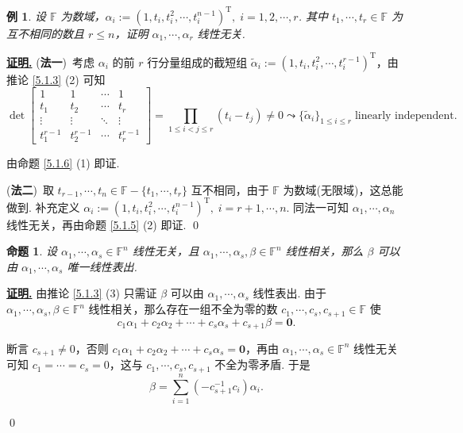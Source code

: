\documentclass[10pt,openany]{article}
\theoremstyle{thmstyle} %
\theoremstyle{defstyle} %
\theoremstyle{prostyle} %
\newtheorem{proposition}[theorem]{命题}
\theoremstyle{exastyle}
\newtheorem{example}[theorem]{例}
\theoremstyle{remstyle}
\renewenvironment{proof}[1][证明]{\par\underline{\textbf{#1.}} \;\fangsong}{\qed\par}
\newcommand{\T}{^{\text{T}}}
\newcommand{\F}{\mathbb{F}}
\begin{document}
\begin{example}
	设 \( \F \) 为数域，\( \alpha_i:=(1,t_i,t_i^2,\cdots,t_i^{n-1})\T, \; i=1,2,\cdots,r \). 其中 \( t_1,\cdots,t_r \in \F \) 为互不相同的数且 \( r \leq n \)，证明 \( \alpha_1,\cdots,\alpha_r \) 线性无关.
\end{example}

\begin{proof}
	(\textbf{法一})\ 考虑 \( \alpha_i \) 的前 \( r \) 行分量组成的截短组 \( \widetilde{\alpha}_i:=(1,t_i,t_i^2,\cdots,t_i^{r-1})\T \)，由推论 \ref{5.1.3} (2) 可知
	\[ \det \begin{bmatrix}
	     1 & 1 & \cdots & 1 \\
	     t_1 & t_2 & \cdots & t_{r} \\
	     \vdots & \vdots & \ddots & \vdots \\
	     t_1^{r-1} & t_2^{r-1} & \cdots & t_{r}^{r-1}
	\end{bmatrix}= \prod_{1 \leq i <j \leq r}^{} (t_i-t_j) \neq 0 \leadsto \{\widetilde{\alpha}_i\}_{1 \leq i \leq r} \; \text{linearly independent.} \]
	
	由命题 \ref{5.1.6} (1) 即证.
	
	(\textbf{法二})\ 取 \( t_{r-1},\cdots,t_n \in \F-\{t_1,\cdots,t_r\} \) 互不相同，由于 \( \F \) 为数域(无限域)，这总能做到. 补充定义 \( \alpha_i:=(1,t_i,t_i^2,\cdots,t_i^{n-1})\T, \; i=r+1,\cdots,n \). 同法一可知 \( \alpha_1,\cdots,\alpha_n \) 线性无关，再由命题 \ref{5.1.5} (2) 即证.
\end{proof}

\begin{proposition} \label{5.1.8}
	设 \( \alpha_1,\cdots,\alpha_s \in \F^n \) 线性无关，且 \( \alpha_1,\cdots,\alpha_s, \beta \in \F^n \) 线性相关，那么 \( \beta \) 可以由 \( \alpha_1,\cdots,\alpha_s \) 唯一线性表出.
\end{proposition}

\begin{proof}
	由推论 \ref{5.1.3} (3) 只需证 \( \beta \) 可以由 \( \alpha_1,\cdots,\alpha_s \) 线性表出. 由于  \( \alpha_1,\cdots,\alpha_s, \beta \in \F^n \) 线性相关，那么存在一组不全为零的数 \( c_1,\cdots,c_s,c_{s+1} \in \F \) 使
	\[ c_1\alpha_1+c_2\alpha_2+\cdots+c_s\alpha_s+c_{s+1}\beta=\bm{0}. \]
	
	断言 \( c_{s+1} \neq 0 \)，否则 \( c_1\alpha_1+c_2\alpha_2+\cdots+c_s\alpha_s=\bm{0} \)，再由  \( \alpha_1,\cdots,\alpha_s \in \F^n \) 线性无关可知 \( c_1=\cdots=c_s=0 \)，这与 \( c_1,\cdots,c_s,c_{s+1} \) 不全为零矛盾. 于是
	\[ \beta= \sum_{i=1}^{n} (-c_{s+1}^{-1}c_i)\alpha_i. \]
	
\end{proof}
\end{document}
